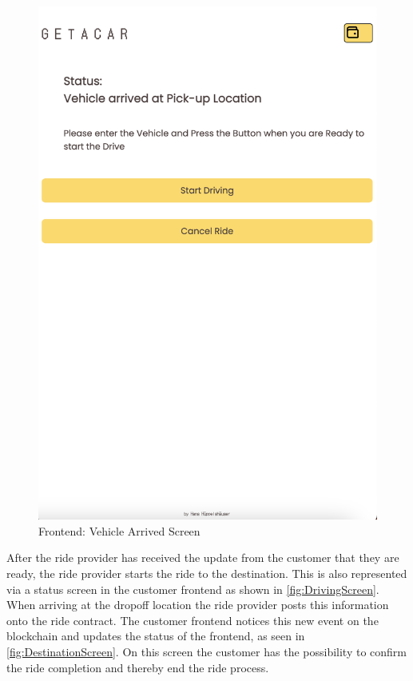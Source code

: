 \begin{figure}[H]
    \hfill
    \begin{minipage}{0.45\linewidth}
        \centering
        \includegraphics[width=\linewidth]{data/ffss/8.png}
        \caption{Frontend: Vehicle Arrived Screen}
        \label{fig:VehicleArrivedScreen}
    \end{minipage}
    
\end{figure}

After the ride provider has received the update from the customer that they are ready, the ride provider starts the ride to the destination. This is also represented via a status screen in the customer frontend as shown in \ref{fig:DrivingScreen}. When arriving at the dropoff location the ride provider posts this information onto the ride contract. The customer frontend notices this new event on the blockchain and updates the status of the frontend, as seen in \ref{fig:DestinationScreen}. On this screen the customer has the possibility to confirm the ride completion and thereby end the ride process.

